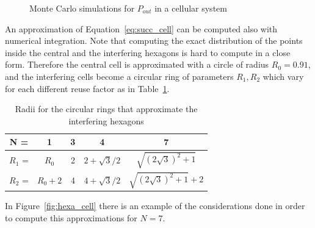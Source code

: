 \documentclass[10pt]{article}
\begin{document}
\begin{figure}[h!]
  \centering
  \caption{Monte Carlo simulations for $P_{out}$ in a cellular system}
  \label{fig:cell_monte}
\end{figure}

An approximation of Equation~\eqref{eq:succ_cell} can be computed also with numerical integration. Note that computing the exact distribution of the points inside the central and the interfering hexagons is hard to compute in a close form. Therefore the central cell is approximated with a circle of radius $R_0 = 0.91$, and the interfering cells become a circular ring of parameters $R_1, R_2$ which vary for each different reuse factor as in Table~\ref{table:radii}.
\begin{table}[h!]
\centering
\begin{tabular}{c|c|c|c|c}
N = & 1 & 3 & 4 & 7 \\ \hline
$R_1$ = & $R_0$ & 2 & $2 + \sqrt{3}/2$ & $ \sqrt{(2\sqrt{3})^2 + 1}$ \\
$R_2$ = & $R_0 + 2$ & 4 & $4 + \sqrt{3}/2$ & $\sqrt{(2\sqrt{3})^2 + 1} + 2$
\end{tabular}
\caption{Radii for the circular rings that approximate the interfering hexagons}
\label{table:radii}
\end{table}


In Figure~\ref{fig:hexa_cell} there is an example of the considerations done in order to compute this approximations for $N = 7$.
\end{document}
